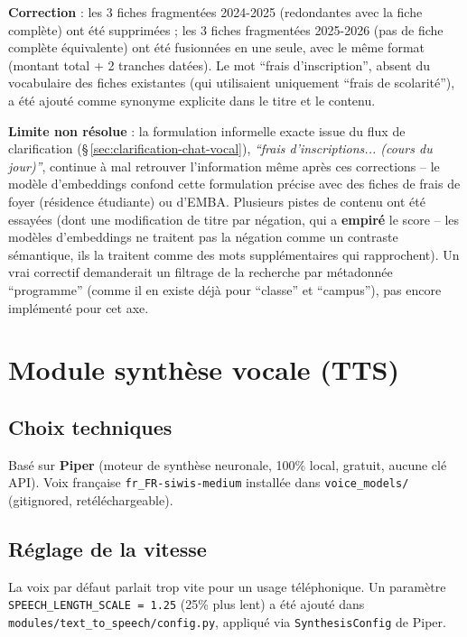 \documentclass[11pt,a4paper]{report}
\begin{document}
\textbf{Correction} : les 3 fiches fragmentées 2024-2025 (redondantes avec la fiche
complète) ont été supprimées ; les 3 fiches fragmentées 2025-2026 (pas de fiche complète
équivalente) ont été fusionnées en une seule, avec le même format (montant total + 2
tranches datées). Le mot ``frais d'inscription'', absent du vocabulaire des fiches
existantes (qui utilisaient uniquement ``frais de scolarité''), a été ajouté comme
synonyme explicite dans le titre et le contenu.

\begin{statutlimite}
\textbf{Limite non résolue} : la formulation informelle exacte issue du flux de
clarification (\S\,\ref{sec:clarification-chat-vocal}), \emph{``frais
d'inscriptions... (cours du jour)''}, continue à mal retrouver l'information même après
ces corrections -- le modèle d'embeddings confond cette formulation précise avec des
fiches de frais de foyer (résidence étudiante) ou d'EMBA. Plusieurs pistes de contenu ont
été essayées (dont une modification de titre par négation, qui a \textbf{empiré} le score
-- les modèles d'embeddings ne traitent pas la négation comme un contraste sémantique, ils
la traitent comme des mots supplémentaires qui rapprochent). Un vrai correctif
demanderait un filtrage de la recherche par métadonnée ``programme'' (comme il en existe
déjà pour ``classe'' et ``campus''), pas encore implémenté pour cet axe.
\end{statutlimite}

\chapter{Module synthèse vocale (TTS)}

\section{Choix techniques}
Basé sur \textbf{Piper} (moteur de synthèse neuronale, 100\% local, gratuit, aucune clé
API). Voix française \texttt{fr\_FR-siwis-medium} installée dans \texttt{voice\_models/}
(gitignored, retéléchargeable).

\section{Réglage de la vitesse}
La voix par défaut parlait trop vite pour un usage téléphonique. Un paramètre
\texttt{SPEECH\_LENGTH\_SCALE = 1.25} (25\% plus lent) a été ajouté dans
\texttt{modules/text\_to\_speech/config.py}, appliqué via \texttt{SynthesisConfig} de
Piper.
\end{document}
